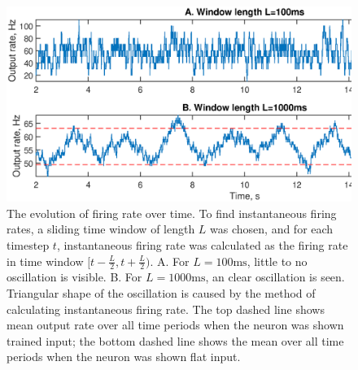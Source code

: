 \documentclass[a4paper,12pt]{report}
\theoremstyle{definition}
\begin{document}
\begin{figure}[!htb]
    \includegraphics[width=\textwidth]{figures/exp6_voltageoscillation.eps}
    \caption{The evolution of firing rate over time. To find instantaneous firing rates, a sliding time window of length $L$ was chosen, and for each timestep $t$, instantaneous firing rate was calculated as the firing rate in time window $[t-\frac{L}{2}, t+\frac{L}{2})$.
    A. For $L=100\mathrm{ms}$, little to no oscillation is visible. B. For $L=1000\mathrm{ms}$, an clear oscillation is seen. Triangular shape of the oscillation is caused by the method of calculating instantaneous firing rate. The top dashed line shows mean output rate over all time periods when the neuron was shown trained input; the bottom dashed line shows the mean over all time periods when the neuron was shown flat input.}
    \label{fig:exp6voltageoscillation}
\end{figure}
\end{document}
